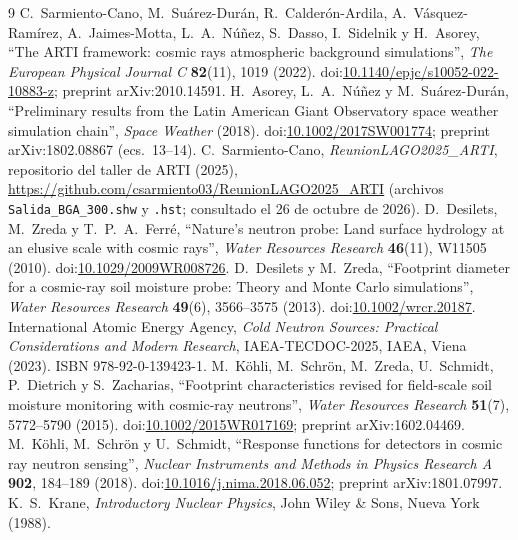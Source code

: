 \documentclass[11pt,a4paper]{article}
\begin{document}
\begin{thebibliography}{9}
 C.~Sarmiento-Cano, M.~Suárez-Durán, R.~Calderón-Ardila, A.~Vásquez-Ramírez, A.~Jaimes-Motta,
L.~A.~Núñez, S.~Dasso, I.~Sidelnik y H.~Asorey, ``The ARTI framework: cosmic rays atmospheric background simulations'',
\emph{The European Physical Journal C} \textbf{82}(11), 1019 (2022).
doi:\href{https://doi.org/10.1140/epjc/s10052-022-10883-z}{10.1140/epjc/s10052-022-10883-z}; preprint arXiv:2010.14591.
 H.~Asorey, L.~A.~Núñez y M.~Suárez-Durán, ``Preliminary results from the Latin American Giant
Observatory space weather simulation chain'', \emph{Space Weather} (2018).
doi:\href{https://doi.org/10.1002/2017SW001774}{10.1002/2017SW001774}; preprint arXiv:1802.08867 (ecs.~13--14).
 C.~Sarmiento-Cano, \emph{ReunionLAGO2025\_ARTI}, repositorio del taller de ARTI (2025),
\url{https://github.com/csarmiento03/ReunionLAGO2025_ARTI} (archivos \texttt{Salida\_BGA\_300.shw} y \texttt{.hst};
consultado el 26 de octubre de 2026).
 D.~Desilets, M.~Zreda y T.~P.~A.~Ferré, ``Nature's neutron probe: Land surface hydrology at
an elusive scale with cosmic rays'', \emph{Water Resources Research} \textbf{46}(11), W11505 (2010).
doi:\href{https://doi.org/10.1029/2009WR008726}{10.1029/2009WR008726}.
 D.~Desilets y M.~Zreda, ``Footprint diameter for a cosmic-ray soil moisture probe: Theory and
Monte Carlo simulations'', \emph{Water Resources Research} \textbf{49}(6), 3566--3575 (2013).
doi:\href{https://doi.org/10.1002/wrcr.20187}{10.1002/wrcr.20187}.
 International Atomic Energy Agency, \emph{Cold Neutron Sources: Practical Considerations and
Modern Research}, IAEA-TECDOC-2025, IAEA, Viena (2023). ISBN 978-92-0-139423-1.
 M.~Köhli, M.~Schrön, M.~Zreda, U.~Schmidt, P.~Dietrich y S.~Zacharias, ``Footprint
characteristics revised for field-scale soil moisture monitoring with cosmic-ray neutrons'', \emph{Water Resources
Research} \textbf{51}(7), 5772--5790 (2015). doi:\href{https://doi.org/10.1002/2015WR017169}{10.1002/2015WR017169};
preprint arXiv:1602.04469.
 M.~Köhli, M.~Schrön y U.~Schmidt, ``Response functions for detectors in cosmic ray neutron
sensing'', \emph{Nuclear Instruments and Methods in Physics Research A} \textbf{902}, 184--189 (2018).
doi:\href{https://doi.org/10.1016/j.nima.2018.06.052}{10.1016/j.nima.2018.06.052}; preprint arXiv:1801.07997.
 K.~S.~Krane, \emph{Introductory Nuclear Physics}, John Wiley \& Sons, Nueva York (1988).

\end{thebibliography}
\end{document}
